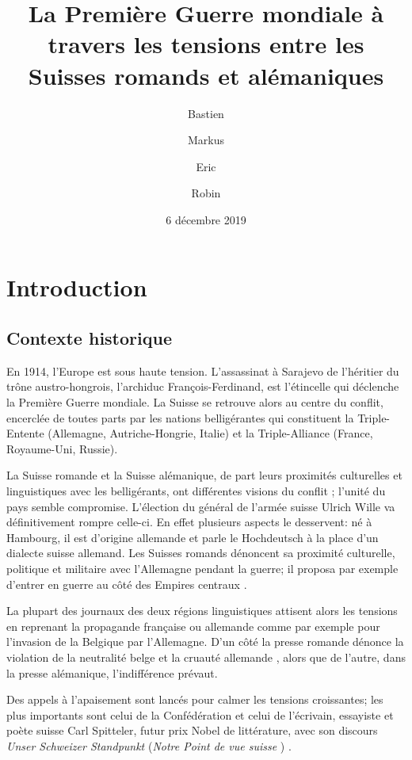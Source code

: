 \documentclass[french,a4paper]{article}
\title{La Première Guerre mondiale à travers les tensions entre les Suisses romands et alémaniques}
\author{\bsc{Beuchat} Bastien \and \bsc{Ding} Markus \and \bsc{Jollès} Eric \and \bsc{Mamie} Robin}
\date{6 décembre 2019} %
\begin{document}
\maketitle

\section*{Introduction}

\subsection*{Contexte historique}

En 1914, l’Europe est sous haute tension.
L’assassinat à Sarajevo de l'héritier du trône austro-hongrois, l'archiduc François-Ferdinand, est l’étincelle qui déclenche la Première Guerre mondiale.
La Suisse se retrouve alors au centre du conflit, encerclée de toutes parts par les nations belligérantes qui constituent la Triple-Entente (Allemagne, Autriche-Hongrie, Italie) et la Triple-Alliance (France, Royaume-Uni, Russie).

La Suisse romande et la Suisse alémanique, de part leurs proximités culturelles et linguistiques avec les belligérants, ont différentes visions du conflit \cite{division}; l'unité du pays semble compromise.
L'élection du général de l'armée suisse Ulrich Wille \cite{wahl} va définitivement rompre celle-ci.
En effet plusieurs aspects le desservent: né à Hambourg, il est d'origine allemande et parle le Hochdeutsch à la place d'un dialecte suisse allemand.
Les Suisses romands dénoncent sa proximité culturelle, politique et militaire avec l'Allemagne pendant la guerre; il proposa par exemple d'entrer en guerre au côté des Empires centraux \cite{krieg}.

La plupart des journaux des deux régions linguistiques attisent alors les tensions en reprenant la propagande française ou allemande \cite{place} \cite{propagande} comme par exemple pour l'invasion de la Belgique par l'Allemagne. D'un côté la presse romande dénonce la violation de la neutralité belge et la cruauté allemande \cite{massacre}, alors que de l'autre, dans la presse alémanique, l'indifférence prévaut.

Des appels à l’apaisement sont lancés pour calmer les tensions croissantes; les plus importants sont celui de la Confédération \cite{apaisement} et celui de l'écrivain, essayiste et poète suisse Carl Spitteler, futur prix Nobel de littérature, avec son discours \og \textit{Unser Schweizer Standpunkt} \fg{} (\og \textit{Notre Point de vue suisse} \fg{}) \cite{standpunkt} \cite{rede_spitteler}.
\end{document}
